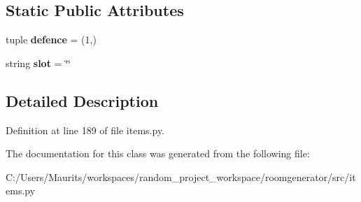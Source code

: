 \subsection*{Static Public Attributes}
\begin{DoxyCompactItemize}
\item 
\hypertarget{classitems_1_1_armor_a013f9190caa68108ab4678e055a75845}{}tuple {\bfseries defence} = (1,)\label{classitems_1_1_armor_a013f9190caa68108ab4678e055a75845}

\item 
\hypertarget{classitems_1_1_armor_a95b8cd1da1fda45c5584923b1298bfd7}{}string {\bfseries slot} = \char`\"{}\char`\"{}\label{classitems_1_1_armor_a95b8cd1da1fda45c5584923b1298bfd7}

\end{DoxyCompactItemize}


\subsection{Detailed Description}


Definition at line 189 of file items.\+py.



The documentation for this class was generated from the following file\+:\begin{DoxyCompactItemize}
\item 
C\+:/\+Users/\+Maurits/workspaces/random\+\_\+project\+\_\+workspace/roomgenerator/src/items.\+py\end{DoxyCompactItemize}
